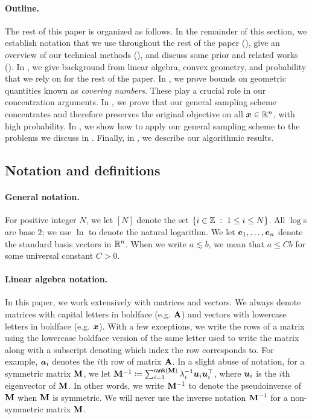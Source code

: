 \documentclass[11pt]{article}
\numberwithin{equation}{section}
\begin{document}
\paragraph{Outline.} The rest of this paper is organized as follows. In the remainder of this section, we establish notation that we use throughout the rest of the paper (), give an overview of our technical methods (), and discuss some prior and related works (). In , we give background from linear algebra, convex geometry, and probability that we rely on for the rest of the paper. In , we prove bounds on geometric quantities known as \textit{covering numbers}. These play a crucial role in our concentration arguments. In , we prove that our general sampling scheme concentrates and therefore preserves the original objective on all $\bm{x} \in \mathbb{R}^n$, with high probability. In , we show how to apply our general sampling scheme to the problems we discuss in . Finally, in , we describe our algorithmic results. %

\subsection{Notation and definitions}
\label{sec:notation}

\paragraph{General notation.} For positive integer $N$, we let $[N]$ denote the set $\left\{i \in \mathbb{Z} {\;\; : \;\;} 1 \le i \le N\right\}$. All $\log$s are base $2$; we use $\ln$ to denote the natural logarithm. We let $\bm{e}_1,\dots,\bm{e}_n$ denote the standard basis vectors in $\mathbb{R}^n$. When we write $a \lesssim b$, we mean that $a \le Cb$ for some universal constant $C > 0$.

\paragraph{Linear algebra notation.} In this paper, we work extensively with matrices and vectors. We always denote matrices with capital letters in boldface (e.g. $\mathbf{A}$) and vectors with lowercase letters in boldface (e.g. $\bm{x}$). With a few exceptions, we write the rows of a matrix using the lowercase boldface version of the same letter used to write the matrix along with a subscript denoting which index the row corresponds to. For example, $\bm{a}_i$ denotes the $i$th row of matrix $\mathbf{A}$. In a slight abuse of notation, for a symmetric matrix $\mathbf{M}$, we let $\mathbf{M}^{-1} \coloneqq \sum_{i=1}^{\mathsf{rank}\left(\mathbf{M}\right)} \lambda_i^{-1}\bm{u}_i\bm{u}_i^{\top}$, where $\bm{u}_i$ is the $i$th eigenvector of $\mathbf{M}$. In other words, we write $\mathbf{M}^{-1}$ to denote the pseudoinverse of $\mathbf{M}$ when $\mathbf{M}$ is symmetric. We will never use the inverse notation $\mathbf{M}^{-1}$ for a non-symmetric matrix $\mathbf{M}$.
\end{document}

